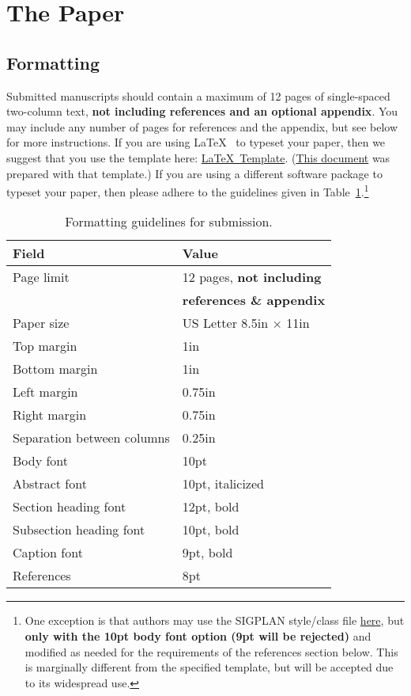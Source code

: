 \documentclass[pageno]{jpaper}
\begin{document}
\section{The Paper}

\subsection{Formatting}

Submitted manuscripts should contain a maximum of 12 pages of single-spaced
two-column text, {\bf not including references and an optional
appendix}. You may include any number of pages for references and the
appendix, but see below for more instructions.  If you are using
\LaTeX~\cite{lamport94} to typeset your paper, then we suggest that you use
the template here:
\href{http://www.cs.utah.edu/asplos14/files/asplos14-latex-template.tar.gz}{\LaTeX~Template}.
(\href{http://www.cs.utah.edu/asplos14/files/asplos14-template.pdf}{This
document} was prepared with that template.)  If you are using a different
software package to typeset your paper, then please adhere to the
guidelines given in Table~\ref{table:formatting}.\footnote{One exception is
that authors may use the SIGPLAN style/class file
\href{http://classic.sigplan.org/sigplanconf.cls}{here}, but {\bf only with
the 10pt body font option (9pt will be rejected)} and modified as needed
for the requirements of the references section below.  This is marginally
different from the specified template, but will be accepted due to its
widespread use.}

\begin{table}[h!]
  \centering
  \begin{tabular}{|l|l|}
    \hline
    \textbf{Field} & \textbf{Value}\\
    \hline
    \hline
    Page limit & 12 pages, {\bf not including}\\
               & {\bf references \& appendix}\\
    \hline
    Paper size & US Letter 8.5in $\times$ 11in\\
    \hline
    Top margin & 1in\\
    \hline
    Bottom margin & 1in\\
    \hline
    Left margin & 0.75in\\
    \hline
    Right margin & 0.75in\\
    \hline
    Separation between columns & 0.25in\\
    \hline
    Body font & 10pt\\
    \hline
    Abstract font & 10pt, italicized\\
    \hline
    Section heading font & 12pt, bold\\
    \hline
    Subsection heading font & 10pt, bold\\
    \hline
    Caption font & 9pt, bold\\
    \hline
    References & 8pt\\
    \hline
  \end{tabular}
  \caption{Formatting guidelines for submission. }
  \label{table:formatting}
\end{table}
\end{document}

